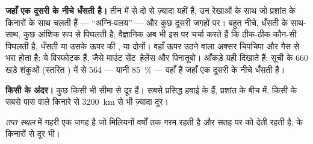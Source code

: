 \textbf{जहाँ एक  दूसरी के नीचे धँसती है।} तीन में से दो से ज़्यादा
 यहीं हैं, उन रेखाओं के साथ जो प्रशांत  के किनारों के साथ चलती
हैं --- ``अग्नि-वलय'' --- और कुछ दूसरी जगहों पर। बहुत नीचे, धँसती  के
साथ-साथ, कुछ  आंशिक रूप से पिघलती है; वैज्ञानिक अब भी इस पर चर्चा करते हैं
कि ठीक-ठीक कौन-सी  पिघलती है, धँसती  या उसके ऊपर की , या दोनों।
वहाँ ऊपर उठने वाला  अक्सर चिपचिपा और गैस से भरा होता है: ये विस्फोटक
 हैं, जैसे माउंट सेंट~हेलेंस और पिनातूबो। आँकड़े यही दिखाते हैं: सूची के
660 खड़े शंकुओं (स्तरित ) में से 564 --- यानी 85~\% --- वहाँ हैं
जहाँ एक  दूसरी के नीचे धँसती है।

\textbf{किसी  के अंदर।} कुछ  किसी भी सीमा से दूर हैं। सबसे
प्रसिद्ध हवाई के  हैं, प्रशांत  के बीच में, किसी  के सबसे
पास वाले किनारे से \qty{3200}{km} से भी ज़्यादा दूर।

\begin{definition}[तप्त स्थल]\label{def:g7:volcanoes:hotspot}
\emph{तप्त स्थल}  में गहरी एक जगह है जो मिलियनों
वर्षों तक गरम रहती है और सतह पर  को  देती रहती है, 
के किनारों से दूर भी।
\end{definition}

